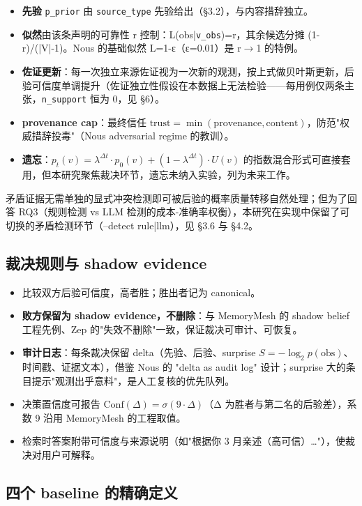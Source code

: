 \documentclass{article}
\begin{document}
\begin{itemize}
\item \textbf{先验} \texttt{p\_prior} 由 \texttt{source\_type} 先验给出（§3.2），与内容措辞独立。
\item \textbf{似然}由该条声明的可靠性 r 控制：L(obs|\texttt{v\_obs})=r，其余候选分摊 (1-r)/(|V|-1)。Nous 的基础似然 L=1-ε（ε=0.01）是 r$\to$1 的特例。
\item \textbf{佐证更新}：每一次独立来源佐证视为一次新的观测，按上式做贝叶斯更新，后验可信度单调提升（佐证独立性假设在本数据上无法检验——每用例仅两条主张，\texttt{n\_support} 恒为 0，见 §6）。
\item \textbf{provenance cap}：最终信任 $\mathrm{trust}=\min(\mathrm{provenance},\mathrm{content})$，防范"权威措辞投毒"（Nous adversarial regime 的教训）。
\item \textbf{遗忘}：$p_t(v) = \lambda^{\Delta t}\cdot p_0(v) + (1-\lambda^{\Delta t})\cdot U(v)$ 的指数混合形式可直接套用，但本研究聚焦裁决环节，遗忘未纳入实验，列为未来工作。
\end{itemize}

矛盾证据无需单独的显式冲突检测即可被后验的概率质量转移自然处理；但为了回答 RQ3（规则检测 vs LLM 检测的成本-准确率权衡），本研究在实现中保留了可切换的矛盾检测环节（--detect rule|llm），见 §3.6 与 §4.2。


\subsection{裁决规则与 shadow evidence}

\begin{itemize}
\item 比较双方后验可信度，高者胜；胜出者记为 canonical。
\item \textbf{败方保留为 shadow evidence，不删除}：与 MemoryMesh 的 shadow belief 工程先例、Zep 的"失效不删除"一致，保证裁决可审计、可恢复。
\item \textbf{审计日志}：每条裁决保留 delta（先验、后验、surprise $S=-\log_2 p(\mathrm{obs})$、时间戳、证据文本），借鉴 Nous 的 "delta as audit log" 设计；surprise 大的条目提示"观测出乎意料"，是人工复核的优先队列。
\item 决策置信度可报告 $\mathrm{Conf}(\Delta)=\sigma(9\cdot\Delta)$（Δ 为胜者与第二名的后验差），系数 9 沿用 MemoryMesh 的工程取值。
\item 检索时答案附带可信度与来源说明（如"根据你 3 月亲述（高可信）…"），使裁决对用户可解释。
\end{itemize}

\subsection{四个 baseline 的精确定义}
\end{document}
